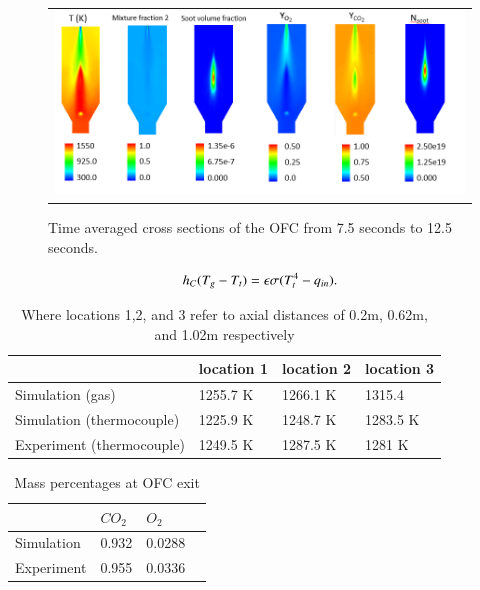 \documentclass[review,3p]{elsarticle}
\begin{document}
\begin{figure}[!h]
\begin{center}
\begin{tabular}{c}
\includegraphics[width=6 in]{../figures/results_averaged.png}
\end{tabular}
\caption{ Time averaged cross sections of the OFC from 7.5 seconds to 12.5 seconds. }
\label{f:results2}
\end{center}
\end{figure}

\begin{equation} \label{e:thermocouple}
h_{C}(T_{g}-T_{t})=\epsilon\sigma(T_{t}^4-q_{in})\\.
\end{equation}

\begin{table}[!h]
	\caption{Where locations 1,2, and 3 refer to axial distances of 0.2m, 0.62m, and 1.02m respectively  }
	\label{t:temperatures}
	\centering
	\begin{tabular}{ | l | l | l | l |}
	\hline
       & location 1 & location 2 & location 3 \\ \hline
    Simulation (gas) & 1255.7 K & 1266.1 K & 1315.4 \\ 
    Simulation (thermocouple) & 1225.9 K & 1248.7 K & 1283.5 K \\ 
    Experiment (thermocouple) & 1249.5  K & 1287.5 K & 1281 K \\ 
    \hline
    \end{tabular}
\end{table}


\begin{table}[!h]
	\caption{Mass percentages at OFC exit }
	\label{t:concentrations}
	\centering
	\begin{tabular}{ | l | l | l | l |}
	\hline
	    & $CO_2$ & $O_2$   \\ \hline
    Simulation &  0.932 & 0.0288   \\ 
    Experiment  & 0.955 & 0.0336  \\  
\hline
\end{tabular}
\end{table}
\end{document}
